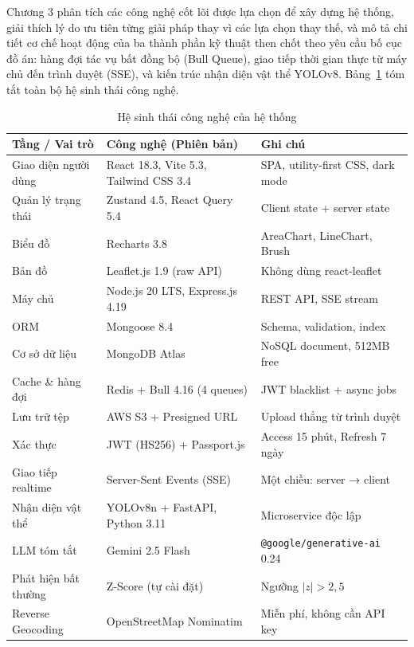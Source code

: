 \documentclass[../DoAn.tex]{subfiles}
\begin{document}
Chương 3 phân tích các công nghệ cốt lõi được lựa chọn để xây dựng hệ thống, giải thích lý do ưu tiên từng giải pháp thay vì các lựa chọn thay thế, và mô tả chi tiết cơ chế hoạt động của ba thành phần kỹ thuật then chốt theo yêu cầu bố cục đồ án: hàng đợi tác vụ bất đồng bộ (Bull Queue), giao tiếp thời gian thực từ máy chủ đến trình duyệt (SSE), và kiến trúc nhận diện vật thể YOLOv8. Bảng~\ref{tab:techstack} tóm tắt toàn bộ hệ sinh thái công nghệ.

\begin{table}[H]
\centering
\caption{Hệ sinh thái công nghệ của hệ thống}
\label{tab:techstack}
\small
\begin{tabular}{|p{3.8cm}|p{4.8cm}|p{4.8cm}|}
\hline
\textbf{Tầng / Vai trò} & \textbf{Công nghệ (Phiên bản)} & \textbf{Ghi chú} \\
\hline
Giao diện người dùng & React 18.3, Vite 5.3, Tailwind CSS 3.4 & SPA, utility-first CSS, dark mode \\
\hline
Quản lý trạng thái & Zustand 4.5, React Query 5.4 & Client state + server state \\
\hline
Biểu đồ & Recharts 3.8 & AreaChart, LineChart, Brush \\
\hline
Bản đồ & Leaflet.js 1.9 (raw API) & Không dùng react-leaflet \\
\hline
Máy chủ & Node.js 20 LTS, Express.js 4.19 & REST API, SSE stream \\
\hline
ORM & Mongoose 8.4 & Schema, validation, index \\
\hline
Cơ sở dữ liệu & MongoDB Atlas & NoSQL document, 512MB free \\
\hline
Cache \& hàng đợi & Redis + Bull 4.16 (4 queues) & JWT blacklist + async jobs \\
\hline
Lưu trữ tệp & AWS S3 + Presigned URL & Upload thẳng từ trình duyệt \\
\hline
Xác thực & JWT (HS256) + Passport.js & Access 15 phút, Refresh 7 ngày \\
\hline
Giao tiếp realtime & Server-Sent Events (SSE) & Một chiều: server → client \\
\hline
Nhận diện vật thể & YOLOv8n + FastAPI, Python 3.11 & Microservice độc lập \\
\hline
LLM tóm tắt & Gemini 2.5 Flash & \texttt{@google/generative-ai} 0.24 \\
\hline
Phát hiện bất thường & Z-Score (tự cài đặt) & Ngưỡng $|z| > 2{,}5$ \\
\hline
Reverse Geocoding & OpenStreetMap Nominatim & Miễn phí, không cần API key \\
\hline
\end{tabular}
\end{table}
\end{document}
